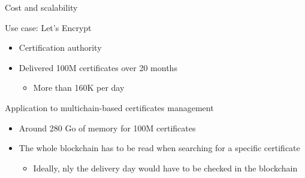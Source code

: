 
\begin{frame}{Cost and scalability}

	\begin{exampleblock}{Use case: Let's Encrypt}
		\begin{itemize}
			\item Certification authority
			\item Delivered 100M certificates over 20 months
			\begin{itemize}
				\item More than 160K per day
			\end{itemize}
		\end{itemize}
	\end{exampleblock}
	
	\begin{exampleblock}{Application to multichain-based certificates management}
		\begin{itemize}
			\item Around 280 Go of memory for 100M certificates
			\item The whole blockchain has to be read when searching for a specific certificate
			\begin{itemize}
				\item Ideally, nly the delivery day would have to be checked in the blockchain
			\end{itemize}
		\end{itemize}
	\end{exampleblock}

\end{frame}


